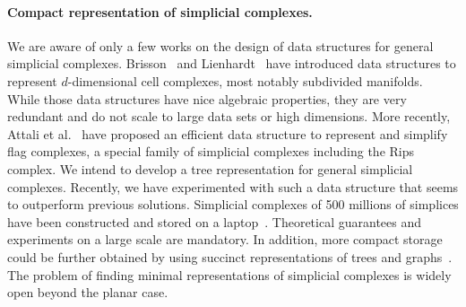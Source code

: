 \paragraph{Compact representation of simplicial complexes.} We are aware of only a few works on the design of data structures for general simplicial complexes. Brisson~\cite{Brisson:1989:RGS:73833.73858} and Lienhardt~\cite{DBLP:journals/ijcga/Lienhardt94} have introduced data structures to represent $d$-dimensional cell complexes, most notably subdivided manifolds. While those data structures have nice algebraic properties, they are very redundant and do not scale to large data sets or high dimensions. More recently, Attali et al.~\cite{Attali2011} have proposed an efficient data structure to represent and simplify flag complexes, a special family of simplicial complexes including the Rips complex.  We intend to develop a tree representation for general simplicial complexes.  Recently, we have experimented with such a data structure
 that seems to outperform previous solutions. Simplicial complexes of 500 millions of simplices have been constructed and stored on a laptop~\cite{bm-dssc-2012}.  Theoretical guarantees and experiments on a large scale are mandatory. In addition, more compact storage could be further obtained by using succinct representations of trees and graphs~\cite{Ferragina:2005:SLT:1097112.1097456,Munro:2002:SRB:586840.586885}. The problem of finding minimal representations of simplicial complexes is widely open beyond the planar case. 











